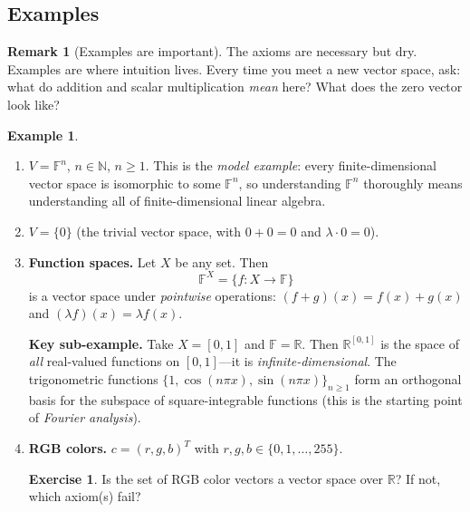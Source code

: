 \documentclass[11pt]{article}
\theoremstyle{definition}
\newtheorem{example}{Example}[section]
\newtheorem{remark}{Remark}[section]
\newtheorem{exercise}{Exercise}[section]
\theoremstyle{plain}
\begin{document}
\subsection{Examples}

\begin{remark}[Examples are important]
  The axioms are necessary but dry.  Examples are where intuition lives.
  Every time you meet a new vector space, ask: what do addition and scalar
  multiplication \emph{mean} here?  What does the zero vector look like?
\end{remark}

\newpage

\begin{example}\leavevmode
  \begin{enumerate}
    \item $V = \mathbb{F}^n$, $n\in\mathbb{N}$, $n\ge 1$.  This is the
      \emph{model example}: every finite-dimensional vector space is
      isomorphic to some $\mathbb{F}^n$, so understanding $\mathbb{F}^n$
      thoroughly means understanding all of finite-dimensional linear algebra.

    \item $V = \{0\}$ (the trivial vector space, with $0+0=0$ and
      $\lambda\cdot 0 = 0$).

    \item \textbf{Function spaces.}  Let $X$ be any set.  Then
      \[
        \mathbb{F}^X = \{f : X \to \mathbb{F}\}
      \]
      is a vector space under \emph{pointwise} operations:
      $(f+g)(x) = f(x)+g(x)$ and $(\lambda f)(x) = \lambda f(x)$.

      \textbf{Key sub-example.}  Take $X = [0,1]$ and $\mathbb{F}=\mathbb{R}$.
      Then $\mathbb{R}^{[0,1]}$ is the space of \emph{all} real-valued
      functions on $[0,1]$---it is \emph{infinite-dimensional}.  The
      trigonometric functions $\{1, \cos(n\pi x), \sin(n\pi x)\}_{n\ge 1}$
      form an orthogonal basis for the subspace of square-integrable
      functions (this is the starting point of \emph{Fourier analysis}).

    \item \textbf{RGB colors.}
      $c = (r,g,b)^T$ with $r,g,b\in\{0,1,\ldots,255\}$.

      \begin{exercise}
        Is the set of RGB color vectors a vector space over $\mathbb{R}$?
        If not, which axiom(s) fail?
      \end{exercise}


\end{enumerate}
\end{example}
\end{document}
